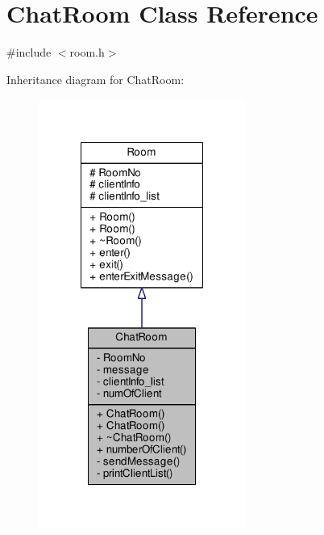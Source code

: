 \hypertarget{class_chat_room}{}\section{Chat\+Room Class Reference}
\label{class_chat_room}


{\ttfamily \#include $<$room.\+h$>$}



Inheritance diagram for Chat\+Room\+:
\nopagebreak
\begin{figure}[H]
\begin{center}
\leavevmode
\includegraphics[width=192pt]{class_chat_room__inherit__graph}
\end{center}
\end{figure}


